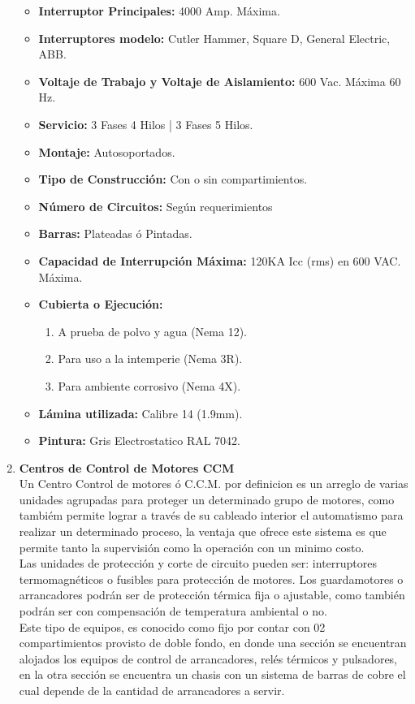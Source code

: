 \documentclass[11pt,letterpaper]{article}
\begin{document}
\begin{enumerate}
\begin{itemize}
			\item \textbf{Interruptor Principales:} 4000 Amp. Máxima.
			\item \textbf{Interruptores modelo:} Cutler Hammer, Square D, General Electric, ABB.
			\item \textbf{Voltaje de Trabajo y Voltaje de Aislamiento:} 600 Vac. Máxima 60 Hz.
			\item \textbf{Servicio:} 3 Fases 4 Hilos | 3 Fases 5 Hilos.
			\item \textbf{Montaje:} Autosoportados.
			\item \textbf{Tipo de Construcción:} Con o sin compartimientos.
			\item \textbf{Número de Circuitos:} Según requerimientos
			\item \textbf{Barras:} Plateadas ó Pintadas.
			\item \textbf{Capacidad de Interrupción Máxima:} 120KA Icc (rms) en 600 VAC. Máxima.
			\item \textbf{Cubierta o Ejecución:} 
				\begin{enumerate}
					\item A prueba de polvo y agua (Nema 12).
					\item Para uso a la intemperie (Nema 3R).
					\item Para ambiente corrosivo (Nema 4X).
				\end{enumerate}
			\item \textbf{Lámina utilizada:} Calibre 14 (1.9mm).
			\item \textbf{Pintura:} Gris Electrostatico RAL 7042.
		\end{itemize}
	\item \textbf{Centros de Control de Motores CCM}\\
		Un Centro  Control de motores ó C.C.M. por definicion es un arreglo de varias unidades agrupadas para proteger un determinado grupo de motores, como tambiém permite lograr a través de su cableado interior el automatismo para realizar un determinado proceso, la ventaja que ofrece este sistema es que permite tanto la supervisión como la operación con un minimo costo.\\	
Las unidades de protección y corte de circuito pueden ser: interruptores termomagnéticos o fusibles para protección de motores. Los guardamotores o arrancadores podrán ser de protección térmica fija o ajustable, como también podrán ser con compensación de temperatura ambiental o no.\\
Este tipo de equipos, es conocido como fijo por contar con 02 compartimientos provisto de doble fondo, en donde una sección se encuentran alojados los equipos de control de arrancadores, relés térmicos y pulsadores, en la otra sección se encuentra un chasis con un sistema de barras de cobre el cual depende de la cantidad de arrancadores a servir.

\end{enumerate}
\end{document}
